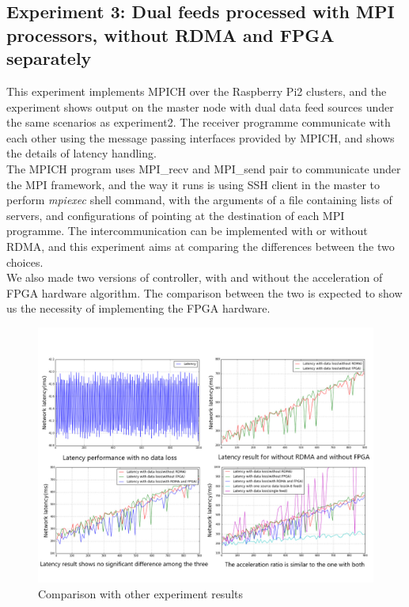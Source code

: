 \documentclass[11pt,openright,a4paper]{report}
\begin{document}
\subsection{Experiment 3: Dual feeds processed with MPI processors, without RDMA and FPGA separately}
This experiment implements MPICH over the Raspberry Pi2 clusters, and the experiment shows output on the master node with dual data feed sources under the same scenarios as experiment2. The receiver programme communicate with each other using the message passing interfaces provided by MPICH, and shows the details of latency handling.\\
The MPICH program uses MPI\_recv and MPI\_send pair to communicate under the MPI framework, and the way it runs is using SSH client in the master to perform \textit{mpiexec} shell command, with the arguments of a file containing lists of servers, and configurations of pointing at the destination of each MPI programme. The intercommunication can be implemented with or without RDMA, and this experiment aims at comparing the differences between the two choices.\\
We also made two versions of controller, with and without the acceleration of FPGA hardware algorithm. The comparison between the two is expected to show us the necessity of implementing the FPGA hardware.\\
\begin{figure}[H]
	\centering
	\includegraphics[width=1.0\linewidth]{picture/experiments/exp3/delay_overall}
	\caption{Comparison with other experiment results}
	\label{fig:delay_overall}
\end{figure}
\end{document}
